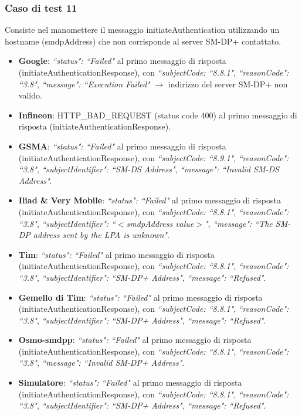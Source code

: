 \documentclass[10pt, oneside]{book}
\begin{document}
\subsubsection{Caso di test 11}
Consiste nel manomettere il messaggio initiateAuthentication utilizzando un hostname (smdpAddress) che non corrisponde al server SM-DP+ contattato.
\begin{itemize}
\item \textbf{Google}: \textit{``status": ``Failed"} al primo messaggio di risposta (initiateAuthenticationResponse), con \textit{``subjectCode: ``8.8.1"}, \textit{``reasonCode": ``3.8"}, \textit{``message": ``Execution Failed"} $\rightarrow$ indirizzo del server SM-DP+ non valido.
\item \textbf{Infineon}: HTTP\_BAD\_REQUEST (status code 400) al primo messaggio di risposta (initiateAuthenticationResponse).
\item \textbf{GSMA}: \textit{``status": ``Failed"} al primo messaggio di risposta (initiateAuthenticationResponse), con \textit{``subjectCode: ``8.9.1"}, \textit{``reasonCode": ``3.8"}, \textit{``subjectIdentifier": ``SM-DS Address"}, \textit{``message": ``Invalid SM-DS Address"}.
\item \textbf{Iliad \& Very Mobile}: \textit{``status": ``Failed"} al primo messaggio di risposta (initiateAuthenticationResponse), con \textit{``subjectCode: ``8.8.1"}, \textit{``reasonCode": ``3.8"}, \textit{``subjectIdentifier": ``$<$smdpAddress value$>$"}, \textit{``message": ``The SM-DP address sent by the LPA is unknown"}.
\item \textbf{Tim}: \textit{``status": ``Failed"} al primo messaggio di risposta (initiateAuthenticationResponse), con \textit{``subjectCode: ``8.8.1"}, \textit{``reasonCode": ``3.8"}, \textit{``subjectIdentifier": ``SM-DP+ Address"}, \textit{``message": ``Refused"}.
\item \textbf{Gemello di Tim}:  \textit{``status": ``Failed"} al primo messaggio di risposta (initiateAuthenticationResponse), con \textit{``subjectCode: ``8.8.1"}, \textit{``reasonCode": ``3.8"}, \textit{``subjectIdentifier": ``SM-DP+ Address"}, \textit{``message": ``Refused"}.
\item \textbf{Osmo-smdpp}: \textit{``status": ``Failed"} al primo messaggio di risposta (initiateAuthenticationResponse), con \textit{``subjectCode: ``8.8.1"}, \textit{``reasonCode": ``3.8"}, \textit{``message": ``Invalid SM-DP+ Address"}.
\item \textbf{Simulatore}: \textit{``status": ``Failed"} al primo messaggio di risposta (initiateAuthenticationResponse), con \textit{``subjectCode: ``8.8.1"}, \textit{``reasonCode": ``3.8"}, \textit{``subjectIdentifier": ``SM-DP+ Address"}, \textit{``message": ``Refused"}.
\end{itemize}
\end{document}
